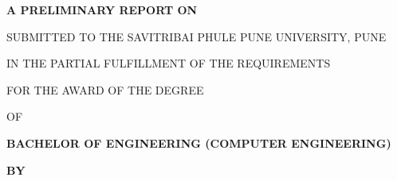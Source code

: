 \documentclass[oneside,a4paper,12pt]{book}
\begin{document}
\vspace{\baselineskip}
\begin{Center}
\textbf{A PRELIMINARY REPORT ON}
\end{Center}\par

\begin{Center}
{\fontsize{16pt}{19.2pt}\selectfont \textbf{{Medical Image Analysis: Brain tumor Detection and Segmentation.}\par}
\end{Center}\par


\vspace{\baselineskip}
\setlength{\parskip}{0.0pt}
\begin{Center}
SUBMITTED TO THE SAVITRIBAI PHULE PUNE UNIVERSITY, PUNE
\end{Center}\par

\begin{Center}
IN THE PARTIAL FULFILLMENT OF THE REQUIREMENTS
\end{Center}\par

\begin{Center}
FOR THE AWARD OF THE DEGREE
\end{Center}\par

\begin{Center}
OF
\end{Center}\par



\setlength{\parskip}{9.96pt}
\begin{Center}
{\fontsize{16pt}{19.2pt}\selectfont \textbf{BACHELOR OF ENGINEERING (COMPUTER ENGINEERING)}\par}
\end{Center}\par

\begin{Center}
{\fontsize{14pt}{16.8pt}\selectfont \textbf{BY}\par}
\end{Center}\par



\end{document}
